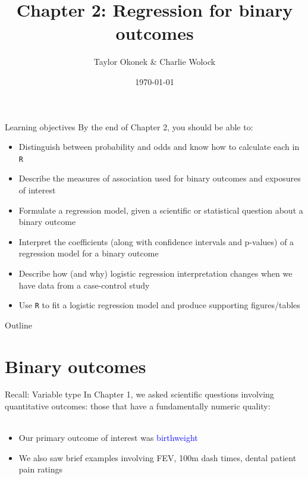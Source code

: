 \documentclass[10pt,t]{beamer}
\title{Chapter 2: Regression for binary outcomes}
\author{Taylor Okonek \& Charlie Wolock}
\date{\today}
\begin{document}
	\begin{frame}
	\titlepage 
\end{frame}

\begin{frame}{Learning objectives}
	By the end of Chapter 2, you should be able to: 
	\begin{itemize}
		\item Distinguish between probability and odds and know how to calculate each in \texttt{R}
		\item Describe the measures of association used for binary outcomes and exposures of interest
		\item Formulate a regression model, given a scientific or statistical question about a binary outcome
		\item Interpret the coefficients (along with confidence intervals and p-values) of a regression model for a binary outcome
		\item Describe how (and why) logistic regression interpretation changes when we have data from a case-control study
		\item Use \texttt{R} to fit a logistic regression model and produce supporting figures/tables
	\end{itemize}
\end{frame}

\begin{frame}{Outline}
\tableofcontents
\end{frame}


\section{Binary outcomes}

\begin{frame}{Recall: Variable type}
	In Chapter 1, we asked scientific questions involving quantitative outcomes: those that have a fundamentally numeric quality: 
	\\~\
	
	\begin{itemize}
		\item Our primary outcome of interest was \textcolor{blue}{birthweight}
		\item We also saw brief examples involving FEV, 100m dash times, dental patient pain ratings
	\end{itemize}
\end{frame}
\end{document}
